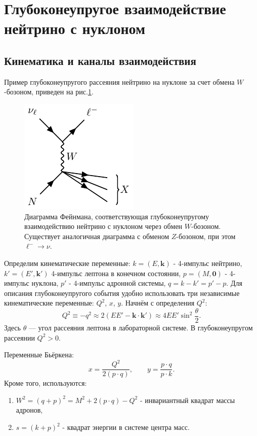 \section{Глубоконеупругое взаимодействие нейтрино с нуклоном}
\subsection{Кинематика и каналы взаимодействия}
Пример глубоконеупругого рассеяния нейтрино  на нуклоне за счет обмена $W$-бозоном, приведен на рис.\ref{fig:DIS}.
\begin{figure}[!h]
\centering
\includegraphics[width=0.4\linewidth]{images/neutrino-nucleon-dis.pdf}
\caption{Диаграмма Фейнмана, соответствующая глубоконеупругому взаимодействию нейтрино с нуклоном через обмен $W$-бозоном.  Существует аналогичная диаграмма с обменом  $Z$-бозоном, при этом $\ell^-\to \nu$.}
\label{fig:DIS}
\end{figure}
Определим кинематические переменные: $k = (E, \bm{k})$ - 4-импульс нейтрино, $k' = (E', \bm{k}')$ 4-импульс  лептона в  конечном состоянии, $p=(M,\bm{0})$ - 4-импульс нуклона, $p'$ - 4-импульс  адронной системы, $q = k-k' = p'-p$. 
Для описания глубоконеупругого события удобно использовать три независимые кинематические переменные: \( Q^2 \), \( x \), \( y \).
Начнём с определения $Q^2$:
\begin{equation}
  Q^2 \equiv -q^2 \approx 2 (EE' - \bm{k} \cdot \bm{k}') \approx 4EE' \sin^2\frac{\theta}{2}.
\end{equation}
Здесь \( \theta \) — угол рассеяния лептона в лабораторной системе. В глубоконеупругом рассеянии \( Q^2 > 0 \).

Переменные Бьёркена:
\begin{equation}
  x = \frac{Q^2}{2(p \cdot q)}, \qquad y = \frac{p \cdot q}{p \cdot k}.
\end{equation}
Кроме того, используются: 
\begin{enumerate}
\item $W^2 = (q+p)^2 = M^2+2 (p\cdot q) -Q^2$ - инвариантный квадрат массы адронов,
\item $s = (k+p)^2$ - квадрат энергии в системе центра масс.
\end{enumerate}

